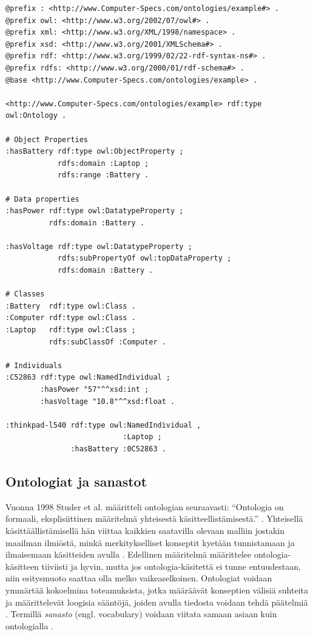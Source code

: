 \documentclass[finnish, 12pt, a4paper, elec, utf8, pdfa, online]{aaltothesis}
\begin{document}
{%
\vskip 0.75cm
\begin{lstlisting}[style=codeblock,caption={OWL esimerkki.},captionpos=b,label={owl_esim}]
@prefix : <http://www.Computer-Specs.com/ontologies/example#> .
@prefix owl: <http://www.w3.org/2002/07/owl#> .
@prefix xml: <http://www.w3.org/XML/1998/namespace> .
@prefix xsd: <http://www.w3.org/2001/XMLSchema#> .
@prefix rdf: <http://www.w3.org/1999/02/22-rdf-syntax-ns#> .
@prefix rdfs: <http://www.w3.org/2000/01/rdf-schema#> .
@base <http://www.Computer-Specs.com/ontologies/example> .

<http://www.Computer-Specs.com/ontologies/example> rdf:type owl:Ontology .

# Object Properties
:hasBattery rdf:type owl:ObjectProperty ;
            rdfs:domain :Laptop ;
            rdfs:range :Battery .

# Data properties
:hasPower rdf:type owl:DatatypeProperty ;
          rdfs:domain :Battery .

:hasVoltage rdf:type owl:DatatypeProperty ;
            rdfs:subPropertyOf owl:topDataProperty ;
            rdfs:domain :Battery .

# Classes
:Battery  rdf:type owl:Class .
:Computer rdf:type owl:Class .
:Laptop   rdf:type owl:Class ;
          rdfs:subClassOf :Computer .

# Individuals
:C52863 rdf:type owl:NamedIndividual ;
        :hasPower "57"^^xsd:int ;
        :hasVoltage "10.8"^^xsd:float .

:thinkpad-l540 rdf:type owl:NamedIndividual ,
                           :Laptop ;
               :hasBattery :0C52863 .

\end{lstlisting}
\vskip 0.75cm

\subsection{Ontologiat ja sanastot}

Vuonna 1998 Studer et al. määritteli ontologian seuraavasti: ``Ontologia on formaali, eksplisiittinen määritelmä yhteisestä käsitteellistämisestä.'' \cite{ontology_def}. Yhteisellä käsittäällistämisellä hän viittaa kaikkien saatavilla olevaan malliin jostakin maailman ilmiöstä, minkä merkitykselliset konseptit kyetään tunnistamaan ja ilmaisemaan käsitteiden avulla \cite{ontology_def}. Edellinen määritelmä määrittelee ontologia-käsitteen tiiviisti ja hyvin, mutta jos ontologia-käsitettä ei tunne entuudestaan, niin esitysmuoto saattaa olla melko vaikeaselkoinen. Ontologiat voidaan ymmärtää kokoelmina toteamuksista, jotka määräävät konseptien välisiä suhteita ja määrittelevät loogisia sääntöjä, joiden avulla tiedosta voidaan tehdä päätelmiä \cite{Berners_visio}. Termillä \textit{sanasto} (engl. vocabulary) voidaan viitata samaan asiaan kuin ontologialla \cite{vocabulary}.

}
\end{document}
